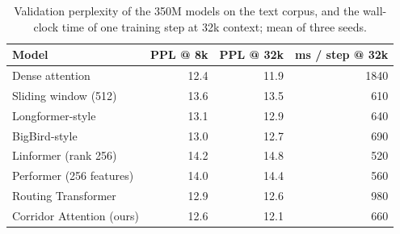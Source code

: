 \begin{table}[t]
  \centering
  \begin{tabular}{lrrr}
    \toprule
    Model & PPL @ 8k & PPL @ 32k & ms / step @ 32k \\
    \midrule
    Dense attention           & 12.4 & 11.9 & 1840 \\
    Sliding window (512)      & 13.6 & 13.5 &  610 \\
    Longformer-style          & 13.1 & 12.9 &  640 \\
    BigBird-style             & 13.0 & 12.7 &  690 \\
    Linformer (rank 256)      & 14.2 & 14.8 &  520 \\
    Performer (256 features)  & 14.0 & 14.4 &  560 \\
    Routing Transformer       & 12.9 & 12.6 &  980 \\
    Corridor Attention (ours) & 12.6 & 12.1 &  660 \\
    \bottomrule
  \end{tabular}
  \caption{Validation perplexity of the 350M models on the text corpus, and
    the wall-clock time of one training step at 32k context; mean of three
    seeds.}
  \label{tab:main}
\end{table}
